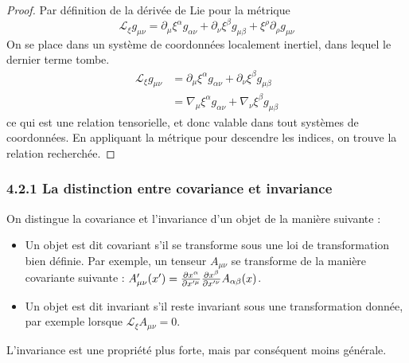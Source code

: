\begin{proof}
    Par définition de la dérivée de Lie pour la métrique 
    \begin{equation}
        \mathcal{L}_{\xi}g_{\mu \nu} = \partial_{\mu}\xi^{\alpha}g_{\alpha \nu} + \partial_{\nu}\xi^{\beta}g_{\mu \beta} + \xi^{\rho}\partial_{\rho}g_{\mu \nu}
        \label{eq:dérivée de Lie}
    \end{equation}
    On se place dans un système de coordonnées localement inertiel, dans lequel le dernier terme tombe. 
    \begin{align}
        \mathcal{L}_{\xi}g_{\mu \nu} &= \partial_{\mu}\xi^{\alpha}g_{\alpha \nu} + \partial_{\nu}\xi^{\beta}g_{\mu \beta}\\
        &=\nabla_{\mu}\xi^{\alpha}g_{\alpha \nu} + \nabla_{\nu}\xi^{\beta}g_{\mu \beta}
    \end{align}
    ce qui est une relation tensorielle, et donc valable dans tout systèmes de coordonnées. En appliquant la métrique pour descendre les indices, on trouve la relation recherchée.
\end{proof}

\subsubsection{4.2.1 La distinction entre covariance et invariance}
On distingue la covariance et l'invariance d'un objet de la manière suivante :
\begin{itemize}
    \item Un objet est dit covariant s'il se transforme sous une loi de transformation bien définie. Par exemple, un tenseur $A_{\mu\nu}$ se transforme de la manière covariante suivante : $A'_{\mu\nu}(x') = \frac{\partial x^\alpha}{\partial x'^\mu}\frac{\partial x^\beta}{\partial x'^\nu} A_{\alpha\beta}(x)$.
    \item Un objet est dit invariant s'il reste invariant sous une transformation donnée, par exemple lorsque $\mathcal{L}_\xi A_{\mu\nu} = 0$.
\end{itemize}
L'invariance est une propriété plus forte, mais par conséquent moins générale. 

